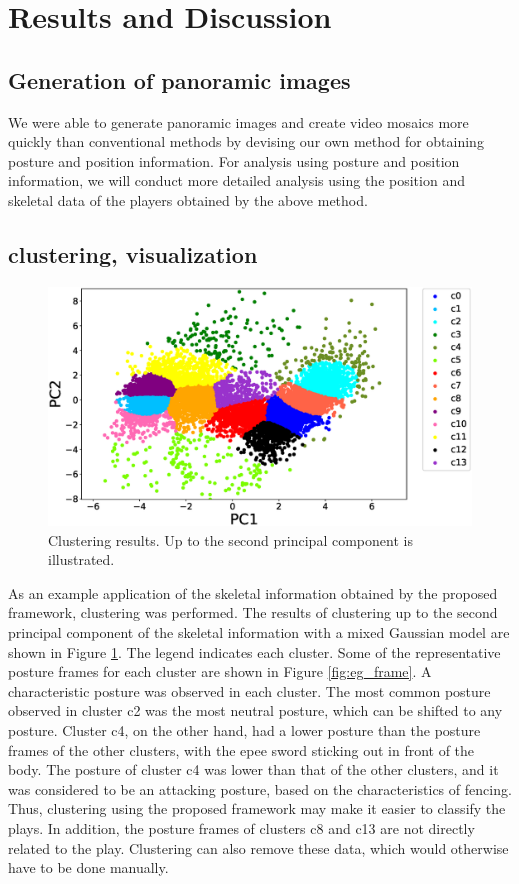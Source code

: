 \section{Results and Discussion}
\subsection{Generation of panoramic images}
We were able to generate panoramic images and create video mosaics more quickly than conventional methods by devising our own method for obtaining posture and position information. For analysis using posture and position information, we will conduct more detailed analysis using the position and skeletal data of the players obtained by the above method.

\subsection{clustering, visualization}

\begin{figure}
    \centering
    \includegraphics[width=\columnwidth]{images/fencing/gmm.eps}
    \caption{Clustering results. Up to the second principal component is illustrated.}
    \label{fig:gmm_result}
\end{figure}

As an example application of the skeletal information obtained by the proposed framework, clustering was performed.
The results of clustering up to the second principal component of the skeletal information with a mixed Gaussian model are shown in Figure \ref{fig:gmm_result}.
The legend indicates each cluster.
Some of the representative posture frames for each cluster are shown in Figure \ref{fig:eg_frame}.
A characteristic posture was observed in each cluster.
The most common posture observed in cluster c2 was the most neutral posture, which can be shifted to any posture.
Cluster c4, on the other hand, had a lower posture than the posture frames of the other clusters, with the epee sword sticking out in front of the body.
The posture of cluster c4 was lower than that of the other clusters, and it was considered to be an attacking posture, based on the characteristics of fencing.
Thus, clustering using the proposed framework may make it easier to classify the plays.
In addition, the posture frames of clusters c8 and c13 are not directly related to the play.
Clustering can also remove these data, which would otherwise have to be done manually.


